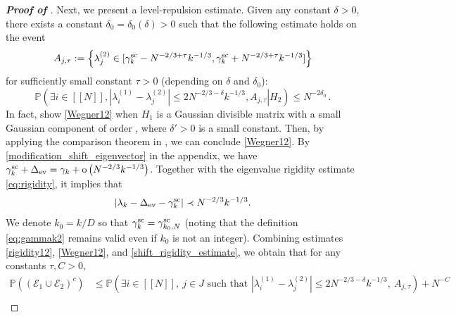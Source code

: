 \documentclass[10pt,reqno]{amsart}
\numberwithin{equation}{section}
\numberwithin{figure}{section}
\theoremstyle{plain} %
\theoremstyle{definition} %
\renewcommand{\txt}[1]{\text{\rm{#1}}}
\renewcommand{\P}{\mathbb{P}}
\newcommand{\qq}[1]{[\![{#1}]\!]}
\newcommand{\pa}[1]{\left({#1}\right)}
\newcommand{\qa}[1]{\left[{#1}\right]}
\newcommand{\absa}[1]{\left\lvert #1 \right\rvert}
\newcommand{\be}{\begin{equation}}
\newcommand{\ee}{\end{equation}}
\newcommand{\oo}{\mathrm{o}}
\numberwithin{equation}{section}
\begin{document}
\begin{proof}[\bf Proof of ]
Next, we present a level-repulsion estimate. Given any constant $\delta>0$, there exists a constant $\delta_0=\delta_0\pa{\delta}>0$ such that the following estimate holds on the event \[A_{j,\tau}:=\Big\{\lambda_j^{\pa{2}}\in [\gamma_k^{\txt{sc}}-N^{-2/3+\tau}k^{-1/3},\gamma_k^{\txt{sc}}+N^{-2/3+\tau}k^{-1/3}]\Big\}\] 
for sufficiently small constant $\tau>0$ (depending on $\delta$ and $\delta_0$):
\be\label{Wegner12} \P \left( \exists i\in \qq{N}, \left. |\lambda_i^{(1)}-\lambda_j^{(2)}|\le 2N^{-2/3-\delta}k^{-1/3}, A_{j,\tau} \right| H_2\right) \le N^{-2\delta_0} \, .\ee
In fact, \cite[Lemmas B.1 and B.12]{BENIGNI2022108109} show \eqref{Wegner12} when $H_1$ is a Gaussian divisible matrix with a small Gaussian component of order , where $\delta'>0$ is a small constant. Then, by applying the comparison theorem in \cite[Proposition 2.10]{Bourgade_JEMS}, we can conclude \eqref{Wegner12}. 
By \eqref{modification_shift_eigenvector} in the appendix, we have $\gamma_k^{\txt{sc}}+\Delta_{\txt{ev}}=\gamma_k+\oo\pa{N^{-2/3}k^{-1/3}}$. Together with the eigenvalue rigidity estimate \eqref{eq:rigidity}, it implies that 
\begin{equation}\label{shift_rigidity_estimate}
    \begin{aligned}
        \absa{\lambda_k-\Delta_{\txt{ev}}-\gamma_k^{\txt{sc}}}\prec N^{-2/3}k^{-1/3}.
    \end{aligned}
\end{equation}
We denote $k_0=k/D$ so that $\gamma_{k}^{\txt{sc}}=\gamma_{k_0,N}^{\txt{sc}}$ (noting that the definition \eqref{eq:gammak2} remains valid even if $k_0$ is not an integer). Combining estimates \eqref{rigidity12}, \eqref{Wegner12}, and \eqref{shift_rigidity_estimate}, we obtain that for any constants $\tau,C>0$, 
\begin{align*}
\P\left( (\mathscr E_1\cup \mathscr E_2)^c \right) &\le \P \left( { \exists i \in \qq{N},\ j\in J \text{ such that } |\lambda_i^{(1)}-\lambda_j^{(2)}|\le 2N^{-2/3-\delta}k^{-1/3} },\ A_{j,\tau}\right) + N^{-C}\\

\end{align*}
\end{proof}
\end{document}
